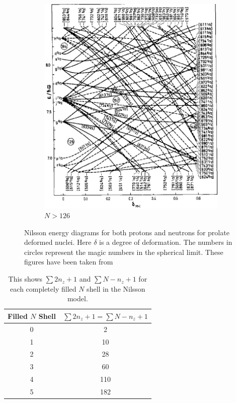 \documentclass[8pt,a4paper, twoside]{report}
\begin{document}
\begin{figure}
\begin{subfigure}[b]{0.48\textwidth}
    \includegraphics[width=\textwidth]{./figures/Nilsson/neutron_deformed126.png}
    \caption{$N>126$}
\end{subfigure}
\caption{Nilsson energy diagrams for both protons and neutrons for prolate deformed nuclei. Here $\delta$ is a degree of deformation. The numbers in circles represent the magic numbers in the spherical limit. These figures have been taken from \cite{BohrMottVol2}}

\end{figure}



\begin{table} 
\center
\begin{tabular}{c|c}
\toprule
\toprule
Filled $N$ Shell & $\sum 2n_z + 1 = \sum N - n_z + 1$ \\ [2pt]
\midrule
0 & 2\\
1 & 10\\
2 & 28\\
3 & 60\\
4 & 110\\
5 & 182 \\
\bottomrule
\bottomrule
\end{tabular}
\caption{This shows $\sum 2n_z + 1$ and $\sum N - n_z + 1$  for each completely filled $N$ shell in the Nilsson model. \label{table:FullShellNz} %
}
\end{table}
\end{document}
